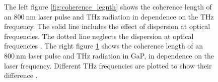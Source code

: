 \begin{figure}
\begin{subfigure}{.5\textwidth}
        \caption{}
        \label{fig:coherence_length_GaP}
    \end{subfigure}%
    \caption{The left figure \ref{fig:coherence_legnth} shows the coherence length of an $\SI{800}{\nano\meter}$ laser pulse and $\si{\tera\hertz}$ radiation in dependence on the $\si{\tera\hertz}$ frequency.
    The solid line includes the effect of dispersion at optical frequencies. The dotted line neglects the dispersion at optical frequencies \cite{coherence_legnth}.
    The right figure \ref{fig:coherence_length_GaP} shows the coherence length of an $\SI{800}{\nano\meter}$ laser pulse and $\si{\tera\hertz}$ radiation in GaP, in dependence on the laser frequency.
    Different $\si{\tera\hertz}$ frequencies are plotted to show their difference \cite{GaP_coherence_length}.}
    \label{fig:coherence_length_both}
\end{figure}
